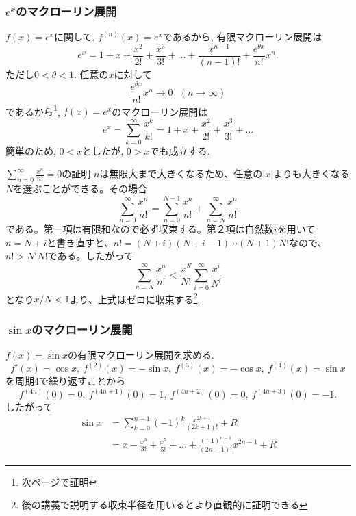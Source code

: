 







\begin{frame}
\frametitle{$e^x$のマクローリン展開}

$f(x)=e^x$に関して, $f^{(n)}(x)=e^x$であるから, 有限マクローリン展開は
$$
e^x=1+x+\frac{x^2}{2!}+\frac{x^3}{3!}+\dots+\frac{x^{n-1}}{(n-1)!}+\frac{e^{\theta x}}{n!}x^n. 
$$
ただし$0<\theta < 1$. 
任意の$x$に対して
$$
\frac{e^{\theta x}}{n!}x^n \to 0 \ \ \ (n \to \infty) 
$$
であるから\footnote{次ページで証明}, $f(x)=e^x$のマクローリン展開は
$$
e^x= \sum_{k=0}^{\infty}\frac{x^k}{k!}
=1+x+\frac{x^2}{2!}+\frac{x^3}{3!}+\dots
$$
簡単のため, $0<x$としたが, $0>x$でも成立する.  
\end{frame}



\begin{slide}{$\sum_{n = 0}^{\infty} \frac{x^n}{n!} = 0$の証明}
$n$は無限大まで大きくなるため、任意の$|x|$よりも大きくなる$N$を選ぶことができる。その場合
\begin{equation}
\sum_{n= 0}^{\infty} \frac{x^n}{n!} = \sum_{n = 0}^{N-1} \frac{x^n}{n!} + \sum_{n=N}^{\infty}\frac{x^n}{n!} \nonumber
\end{equation}
である。第一項は有限和なので必ず収束する。第２項は自然数$i$を用いて$n=N+i $と書き直すと、$n! = (N+i)(N+i-1) \cdots (N+1) N! $なので、$n! > N^i N!$である。したがって
\begin{equation}
 \sum_{n=N}^{\infty}\frac{x^n}{n!} < \frac{x^N}{N!}\sum_{i=0}^\infty \frac{x^i}{N^i} \nonumber
\end{equation}
となり$x/N<1$より、上式はゼロに収束する\footnote{後の講義で説明する収束半径を用いるとより直観的に証明できる}. 
\end{slide}


\begin{frame}
\frametitle{$\sin x$のマクローリン展開}

$f(x)=\sin x$の有限マクローリン展開を求める. 
$$
f'(x)=\cos x, \ f^{(2)}(x)=-\sin x, \ f^{(3)}(x)=-\cos x, \ f^{(4)}(x)=\sin x
$$
を周期$4$で繰り返すことから
$$
 f^{(4n)}(0)=0, \ f^{(4n+1)}(0)=1, \ f^{(4n+2)}(0)=0, \ f^{(4n+3)}(0)=-1. 
$$
したがって
\begin{align*}
\sin x & = \sum_{k=0}^{n-1}(-1)^k\frac{x^{2k+1}}{(2k+1)!}+R \\
& = x-\frac{x^3}{3!}+\frac{x^5}{5!}+\dots+\frac{(-1)^{n-1}}{(2n-1)!}x^{2n-1}+R
\end{align*}
	

\end{frame}




